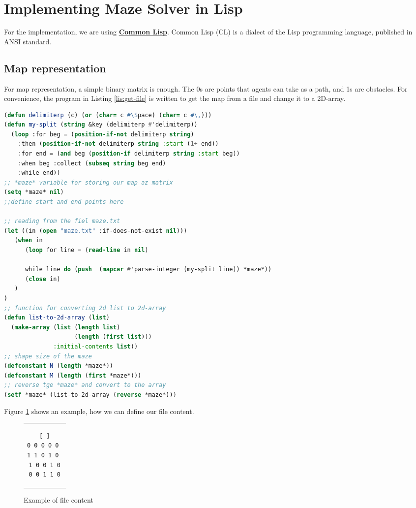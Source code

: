 \section{Implementing Maze Solver in Lisp}
For the implementation, we are using 
\href{https://en.wikipedia.org/wiki/Common_Lisp}
{\textbf{Common Lisp}}. Common Lisp (CL) is a dialect of the 
Lisp programming language, published in ANSI standard.
\subsection{Map representation}
For map representation, a simple binary matrix is 
enough. The 0s are points that agents can take as 
a path, and 1s are obstacles. For convenience, the 
program in Listing \ref{lis:get-file} is written to get the map from a file 
and change it to a 2D-array.
\begin{lstlisting}[language=Lisp, style=mystyle,
                 caption=Getting map from a file and represent it as 2D-array,
                 label=lis:get-file]
(defun delimiterp (c) (or (char= c #\Space) (char= c #\,)))
(defun my-split (string &key (delimiterp #'delimiterp))
  (loop :for beg = (position-if-not delimiterp string)
    :then (position-if-not delimiterp string :start (1+ end))
    :for end = (and beg (position-if delimiterp string :start beg))
    :when beg :collect (subseq string beg end)
    :while end))
;; *maze* variable for storing our map az matrix
(setq *maze* nil)
;;define start and end points here

;; reading from the fiel maze.txt
(let ((in (open "maze.txt" :if-does-not-exist nil)))
   (when in
      (loop for line = (read-line in nil)
      
      while line do (push  (mapcar #'parse-integer (my-split line)) *maze*))
      (close in)
   )
)
;; function for converting 2d list to 2d-array
(defun list-to-2d-array (list)
  (make-array (list (length list)
                    (length (first list)))
              :initial-contents list))
;; shape size of the maze
(defconstant N (length *maze*))
(defconstant M (length (first *maze*)))
;; reverse tge *maze* and convert to the array
(setf *maze* (list-to-2d-array (reverse *maze*)))
\end{lstlisting}
Figure \ref{fig:file-content} shows an example, how we can
define our file content.
\begin{figure}[H]
\centering
\begin{tabular}{c}
    
\begin{lstlisting}[ ]
0 0 0 0 0 
1 1 0 1 0 
1 0 0 1 0
0 0 1 1 0
\end{lstlisting}
\end{tabular}    
\caption{Example of file content}
\label{fig:file-content}
\end{figure}

